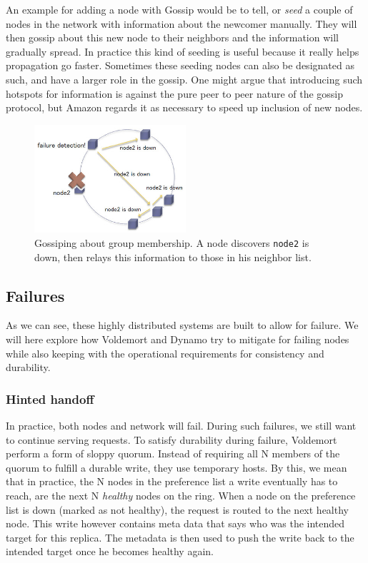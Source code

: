 \begin{itemize}
An example for adding a node with Gossip would be to tell, or \emph{seed} a couple of nodes in the network with information about the newcomer manually. They will then gossip about this new node to their neighbors and the information will gradually spread. In practice this kind of seeding is useful because it really helps propagation go faster. Sometimes these seeding nodes can also be designated as such, and have a larger role in the gossip. One might argue that introducing such hotspots for information is against the pure peer to peer nature of the gossip protocol, but Amazon regards it as necessary to speed up inclusion of new nodes.

\begin{figure}[h]
    \centering
    \includegraphics[width=0.5\textwidth]{background/figures/gossip}
    \caption{Gossiping about group membership. A node discovers \texttt{node2} is down, then relays this information to those in his neighbor list.}
    \label{fig:gossip}
\end{figure}


\end{itemize}

\subsection{Failures}
\label{sec:failures}
As we can see, these highly distributed systems are built to allow for failure. We will here explore how Voldemort and Dynamo try to mitigate for failing nodes while also keeping with the operational requirements for consistency and durability. 

\subsubsection{Hinted handoff}
In practice, both nodes and network will fail. During such failures, we still want to continue serving requests.
To satisfy durability during failure, Voldemort perform a form of sloppy quorum. 
Instead of requiring all N members of the quorum to fulfill a durable write, they use temporary hosts. 
By this, we mean that in practice, the N nodes in the preference list a write eventually has to reach, are the next N \emph{healthy} nodes on the ring.
When a node on the preference list is down (marked as not healthy), the request is routed to the next healthy node. 
This write however contains meta data that says who was the intended target for this replica. 
The metadata is then used to push the write back to the intended target once he becomes healthy again.

